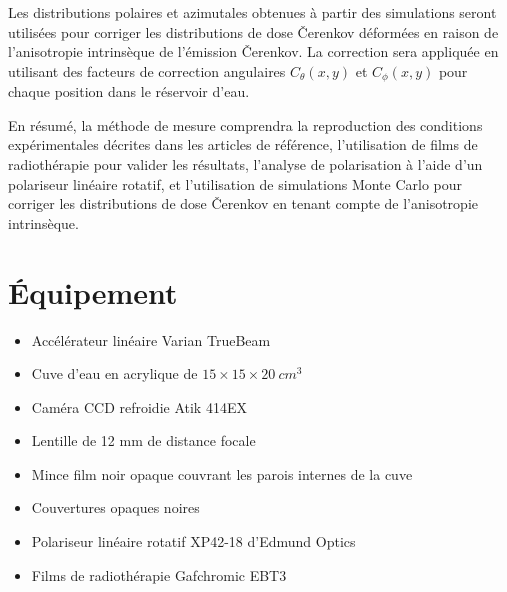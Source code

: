 \documentclass{Thesis}
\begin{document}
Les distributions polaires et azimutales obtenues à partir des simulations seront utilisées pour corriger les distributions de dose Čerenkov déformées en raison de l'anisotropie intrinsèque de l'émission Čerenkov.
La correction sera appliquée en utilisant des facteurs de correction angulaires $C_{\theta}(x, y)$ et $C_{\phi}(x, y)$ pour chaque position dans le réservoir d'eau.

En résumé, la méthode de mesure comprendra la reproduction des conditions expérimentales décrites dans les articles de référence, l'utilisation de films de radiothérapie pour valider les résultats, l'analyse de polarisation à l'aide d'un polariseur linéaire rotatif, et l'utilisation de simulations Monte Carlo pour corriger les distributions de dose Čerenkov en tenant compte de l'anisotropie intrinsèque.

\section*{Équipement}
\begin{multicols}{2}
\begin{itemize}
    \setlength\itemsep{1mm}
    \item Accélérateur linéaire Varian TrueBeam
    \item Cuve d'eau en acrylique de $15 \times 15 \times \SI{20}{cm^3}$
    \item Caméra CCD refroidie Atik 414EX
    \item Lentille de 12 mm de distance focale
    \item Mince film noir opaque couvrant les parois internes de la cuve
    \item Couvertures opaques noires
    \item Polariseur linéaire rotatif XP42-18 d'Edmund Optics
    \item Films de radiothérapie Gafchromic EBT3
\end{itemize}
\end{multicols}

\newpage
\printbibliography
\end{document}
